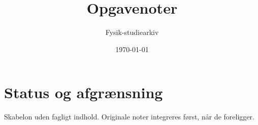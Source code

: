 \documentclass[11pt,a4paper,oneside]{book}
\begin{document}
\title{Opgavenoter}
\author{Fysik-studiearkiv}\date{\today}\maketitle\tableofcontents
\chapter{Status og afgrænsning}
Skabelon uden fagligt indhold. Originale noter integreres først, når de foreligger.
\end{document}
